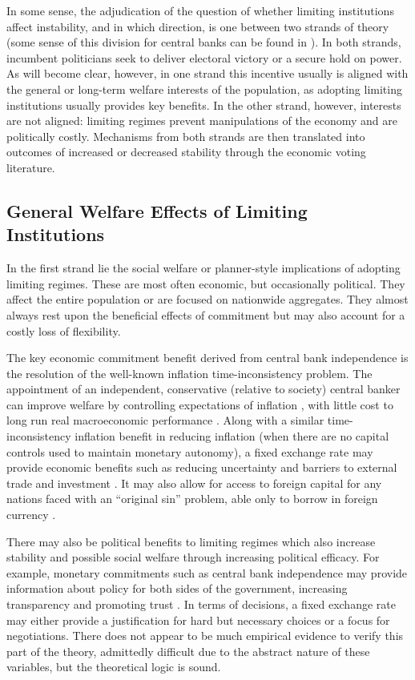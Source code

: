 \documentclass{article}
\begin{document}
    In some sense, the adjudication of the question of whether limiting institutions affect instability, and in which direction, is one between two strands of theory (some sense of this division for central banks can be found in \cite[p.212]{alesina_political_1997}). In both strands, incumbent politicians seek to deliver electoral victory or a secure hold on power. As will become clear, however, in one strand this incentive usually is aligned with the general or long-term welfare interests of the population, as adopting limiting institutions usually provides key benefits. In the other strand, however, interests are not aligned: limiting regimes prevent manipulations of the economy and are politically costly. Mechanisms from both strands are then translated into outcomes of increased or decreased stability through the economic voting literature.

    \subsection*{General Welfare Effects of Limiting Institutions}

    In the first strand lie the social welfare or planner-style implications of adopting limiting regimes. These are most often economic, but occasionally political. They affect the entire population or are focused on nationwide aggregates. They almost always rest upon the beneficial effects of commitment but may also account for a costly loss of flexibility.

    The key economic commitment benefit derived from central bank independence is the resolution of the well-known inflation time-inconsistency problem. The appointment of an independent, conservative (relative to society) central banker can improve welfare by controlling expectations of inflation \citep{rogoff_optimal_1985}, with little cost to long run real macroeconomic performance \citep{alesina_central_1993}. Along with a similar time-inconsistency inflation benefit in reducing inflation (when there are no capital controls used to maintain monetary autonomy), a fixed exchange rate may provide economic benefits such as reducing uncertainty and barriers to external trade and investment \citep{mundell_theory_1961}. It may also allow for access to foreign capital for any nations faced with an “original sin” problem, able only to borrow in foreign currency \citep{eichengreen_other_2005}.

    There may also be political benefits to limiting regimes which also increase stability and possible social welfare through increasing political efficacy. For example, monetary commitments such as central bank independence may provide information about policy for both sides of the government, increasing transparency and promoting trust \citep{bernhard_political_2002}. In terms of decisions, a fixed exchange rate may either provide a justification for hard but necessary choices or a focus for negotiations. There does not appear to be much empirical evidence to verify this part of the theory, admittedly difficult due to the abstract nature of these variables, but the theoretical logic is sound.
\end{document}

